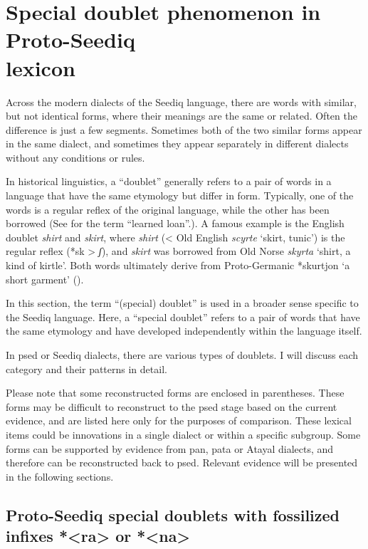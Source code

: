 \section[Special doublet phenomenon in Proto-Seediq lexicon]{Special doublet phenomenon in Proto-Seediq\\ lexicon} \label{sec:sepical_doublet}

Across the modern dialects of the Seediq language, there are words with similar, but not identical forms, where their meanings are the same or related. Often the difference is just a few segments. Sometimes both of the two similar forms appear in the same dialect, and sometimes they appear separately in different dialects without any conditions or rules. 

In historical linguistics, a ``doublet'' generally refers to a pair of words in a language that have the same etymology but differ in form. Typically, one of the words is a regular reflex of the original language, while the other has been borrowed (See \textcite[99]{campbell2007HLglossary} for the term ``learned loan''.). A famous example is the English doublet \textit{shirt} and \textit{skirt}, where \textit{shirt} (< Old English \textit{scyrte} `skirt, tunic') is the regular reflex (*sk > \textit{ʃ}), and \textit{skirt} was borrowed from Old Norse \textit{skyrta} `shirt, a kind of kirtle'. Both words ultimately derive from Proto-Germanic *skurtjon `a short garment' (\cite[70]{campbell2021histling}).

In this section, the term ``(special) doublet'' is used in a broader sense specific to the Seediq language. Here, a ``special doublet'' refers to a pair of words that have the same etymology and have developed independently within the language itself.

In \acl{psed} or Seediq dialects, there are various types of doublets. I will discuss each category and their patterns in detail.

Please note that some reconstructed forms are enclosed in parentheses. These forms may be difficult to reconstruct to the \acl{psed} stage based on the current evidence, and are listed here only for the purposes of comparison. These lexical items could be innovations in a single dialect or within a specific subgroup. Some forms can be supported by evidence from \acl{pan}, \acl{pata} or Atayal dialects, and therefore can be reconstructed back to \acl{psed}. Relevant evidence will be presented in the following sections.

\subsection{Proto-Seediq special doublets with fossilized infixes *<ra> or *<na>}

